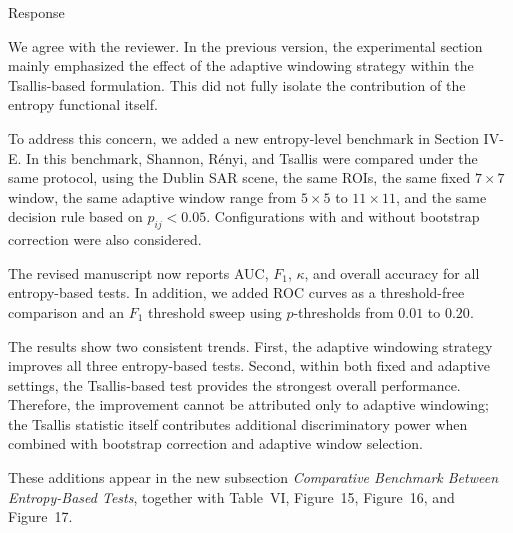 \documentclass[11pt]{report}
\begin{document}
\begin{responsebox}{Response}

We agree with the reviewer. In the previous version, the experimental section mainly emphasized the effect of the adaptive windowing strategy within the Tsallis-based formulation. This did not fully isolate the contribution of the entropy functional itself.

To address this concern, we added a new entropy-level benchmark in Section IV-E. In this benchmark, Shannon, Rényi, and Tsallis were compared under the same protocol, using the Dublin SAR scene, the same ROIs, the same fixed $7\times7$ window, the same adaptive window range from $5\times5$ to $11\times11$, and the same decision rule based on $p_{ij}<0.05$. Configurations with and without bootstrap correction were also considered.

The revised manuscript now reports AUC, $F_1$, $\kappa$, and overall accuracy for all entropy-based tests. In addition, we added ROC curves as a threshold-free comparison and an $F_1$ threshold sweep using $p$-thresholds from $0.01$ to $0.20$.

The results show two consistent trends. First, the adaptive windowing strategy improves all three entropy-based tests. Second, within both fixed and adaptive settings, the Tsallis-based test provides the strongest overall performance. Therefore, the improvement cannot be attributed only to adaptive windowing; the Tsallis statistic itself contributes additional discriminatory power when combined with bootstrap correction and adaptive window selection.

These additions appear in the new subsection \emph{Comparative Benchmark Between Entropy-Based Tests}, together with Table~VI, Figure~15, Figure~16, and Figure~17.

\end{responsebox}


\vspace{1em}
\end{document}

